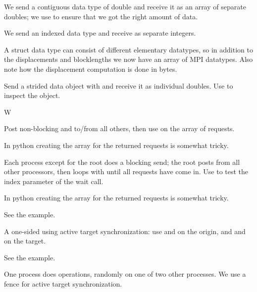 
We send a contiguous data type of double and receive it as an array of
separate doubles; we use  to ensure that
we got the right amount of data.
%


We send an indexed data type and receive as separate integers.
%


A struct data type can consist of different elementary datatypes, so
in addition to the displacements and blocklengths we now have an array
of MPI datatypes. Also note how the displacement computation is done
in bytes.
%


Send a strided data object with  and receive it as
individual doubles. Use  to inspect the
 object.
%

 {W}


Post non-blocking  and
 to/from all others, then use 
on the array of requests.
%

In python creating the array for the returned requests is somewhat
tricky.
%


Each process except for the root does a blocking send; the root
posts  from all other processors, then loops
with  until all requests have come in. Use
 to test the index parameter of the wait
call.
%

In python creating the array for the returned requests is somewhat
tricky.
%


See the  example.


A one-sided  using active target synchronization:
use  and 
on the origin, and  and
 on the target.
%


See the  example.


One process does  operations, randomly on one of
two other processes. We use a fence for active target synchronization.
%
